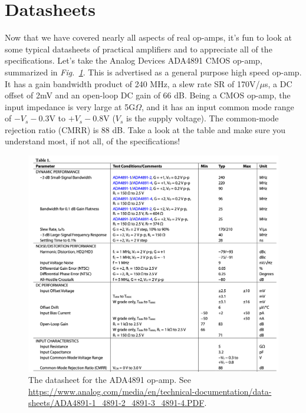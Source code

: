 \section{Datasheets}
Now that we have covered nearly all aspects of real op-amps, it's fun to look at some typical datasheets of practical amplifiers and to appreciate all of the specifications.  Let's take the Analog Devices ADA4891 CMOS op-amp, summarized in \emph{Fig.~\ref{fig:adi_datasheet.png}}.  This is advertised as a general purpose high speed op-amp.  It has a gain bandwidth product of 240 MHz, a slew rate SR of 170V/$\mu$s, a DC offset of 2mV and an open-loop DC gain of 66 dB.  Being a CMOS op-amp, the input impedance is very large at 5G$\Omega$, and it has an input common mode range of $-V_s - 0.3$V to $+V_s - 0.8$V ($V_s$ is the supply voltage).  The common-mode rejection ratio (CMRR) is 88 dB.  Take a look at the table and make sure you understand most, if not all, of the specifications!
\begin{figure}[tb]
\centering
\includegraphics[width=1\columnwidth]{ada4891_datasheet_table.png}
\caption{The datasheet for the ADA4891 op-amp.  See \url{https://www.analog.com/media/en/technical-documentation/data-sheets/ADA4891-1_4891-2_4891-3_4891-4.PDF}.}
\label{fig:adi_datasheet.png}
\end{figure}
